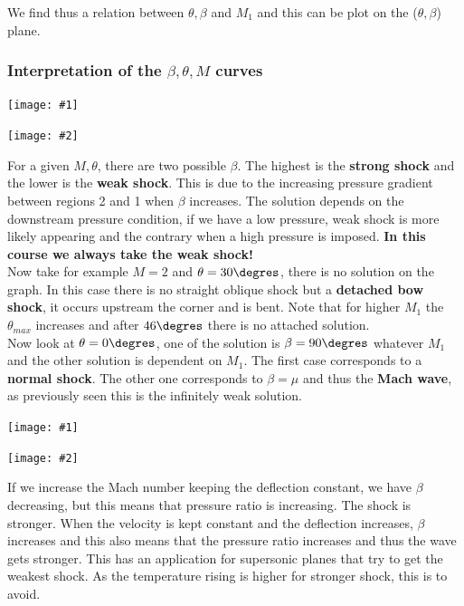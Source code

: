 \documentclass[british,french,11pt, a4paper, openany]{article}
\newcommand{\minifig}[6]{
	\begin{center}%
		\begin{minipage}{#5\textwidth}%
			\texttt{[image: \#1]}%
			\captionof{figure}{}%
			\label{#1}%
		\end{minipage}%
		\begin{minipage}{#6\textwidth}%
			\texttt{[image: \#2]}%
			\captionof{figure}{}%
			\label{#2}%
		\end{minipage}%
	\end{center}
}
\begin{document}
We find thus a relation between $\theta, \beta$ and $M_1$ and this can be plot on the ($\theta, \beta$) plane.

\subsubsection{Interpretation of the $\beta, \theta, M$ curves}
\minifig{ch8/36}{ch8/37}{0.12}{0.16}{0.49}{0.49}
For a given $M, \theta$, there are two possible $\beta$. The highest is the \textbf{strong shock} and the lower is the \textbf{weak shock}. This is due to the increasing pressure gradient between regions 2 and 1 when $\beta$ increases. The solution depends on the downstream pressure condition, if we have a low pressure, weak shock is more likely appearing and the contrary when a high pressure is imposed. \textbf{In this course we always take the weak shock!} \\

Now take for example $M=2$ and $\theta = 30\degres$, there is no solution on the graph. In this case there is no straight oblique shock but a \textbf{detached bow shock}, it occurs upstream the corner and is bent.  Note that for higher $M_1$ the $\theta _{max}$ increases and after $46\degres$ there is no attached solution. \\

Now look at $\theta = 0\degres$, one of the solution is $\beta = 90\degres$ whatever $M_1$ and the other solution is dependent on $M_1$. The first case corresponds to a \textbf{normal shock}. The other one corresponds to $\beta = \mu$ and thus the \textbf{Mach wave}, as previously seen this is the infinitely weak solution.

\minifig{ch8/38}{ch8/39}{0.15}{0.15}{0.49}{0.49}
If we increase the Mach number keeping the deflection constant, we have $\beta$ decreasing, but this means that pressure ratio is increasing. The shock is stronger. When the velocity is kept constant and the deflection increases, $\beta$ increases and this also means that the pressure ratio increases and thus the wave gets stronger. This has an application for supersonic planes that try to get the weakest shock. As the temperature rising is higher for stronger shock, this is to avoid. 


\end{document}
